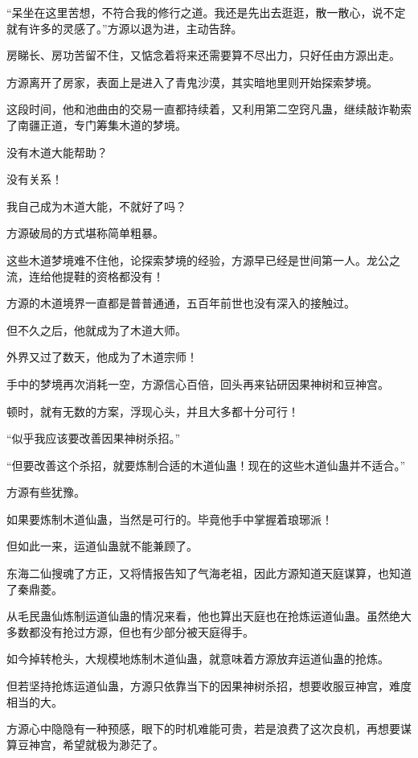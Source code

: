 \begin{this_body}
“呆坐在这里苦想，不符合我的修行之道。我还是先出去逛逛，散一散心，说不定就有许多的灵感了。”方源以退为进，主动告辞。

房睇长、房功苦留不住，又惦念着将来还需要算不尽出力，只好任由方源出走。

方源离开了房家，表面上是进入了青鬼沙漠，其实暗地里则开始探索梦境。

这段时间，他和池曲由的交易一直都持续着，又利用第二空窍凡蛊，继续敲诈勒索了南疆正道，专门筹集木道的梦境。

没有木道大能帮助？

没有关系！

我自己成为木道大能，不就好了吗？

方源破局的方式堪称简单粗暴。

这些木道梦境难不住他，论探索梦境的经验，方源早已经是世间第一人。龙公之流，连给他提鞋的资格都没有！

方源的木道境界一直都是普普通通，五百年前世也没有深入的接触过。

但不久之后，他就成为了木道大师。

外界又过了数天，他成为了木道宗师！

手中的梦境再次消耗一空，方源信心百倍，回头再来钻研因果神树和豆神宫。

顿时，就有无数的方案，浮现心头，并且大多都十分可行！

“似乎我应该要改善因果神树杀招。”

“但要改善这个杀招，就要炼制合适的木道仙蛊！现在的这些木道仙蛊并不适合。”

方源有些犹豫。

如果要炼制木道仙蛊，当然是可行的。毕竟他手中掌握着琅琊派！

但如此一来，运道仙蛊就不能兼顾了。

东海二仙搜魂了方正，又将情报告知了气海老祖，因此方源知道天庭谋算，也知道了秦鼎菱。

从毛民蛊仙炼制运道仙蛊的情况来看，他也算出天庭也在抢炼运道仙蛊。虽然绝大多数都没有抢过方源，但也有少部分被天庭得手。

如今掉转枪头，大规模地炼制木道仙蛊，就意味着方源放弃运道仙蛊的抢炼。

但若坚持抢炼运道仙蛊，方源只依靠当下的因果神树杀招，想要收服豆神宫，难度相当的大。

方源心中隐隐有一种预感，眼下的时机难能可贵，若是浪费了这次良机，再想要谋算豆神宫，希望就极为渺茫了。

\end{this_body}

